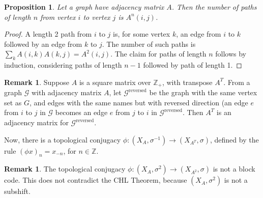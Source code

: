\documentclass{amsart}
\newtheorem{prop}[equation]{Proposition}
\theoremstyle{definition}
\newtheorem{rem}[equation]{Remark}
\theoremstyle{definition}
\newcommand{\Z}{\mathbb Z}
\numberwithin{equation}{subsection}
\begin{document}
\begin{prop}  \label{pathsandpowers}
Let a graph have adjacency matrix $A$.
Then the number of paths of length $n$ from vertex $i$ to
vertex $j$ is $A^n(i,j)$.
\end{prop}
\begin{proof}
A length 2 path from $i$ to $j$ is, for some vertex $k$,
 an edge from $i$ to $k$ followed by an edge from $k$ to $j$.
The number of such paths is $\sum_k A(i,k) A(k,j) = A^2 (i,j)$.
The claim for paths of length $n$ follows by induction,
considering paths of length $n-1$ followed by path of length 1.
\end{proof}


\begin{rem} \label{TransposeAndInverse}
Suppose $A$ is a square matrix over $\Z_+$, with transpose $A^T$.
From a graph $\mathcal G$ with adjacency matrix $A$,
let $\mathcal G^{\text{reversed}} $ be the graph with the same vertex set as $G$,
and edges with the same names but with reversed direction
(an edge $e$ from $i$ to $j$ in $\mathcal G$ becomes an edge
$e$ from $j$ to $i$ in  $\mathcal G^{\text{reversed}} $.
 Then
 $A^T$ is an adjacency matrix for $\mathcal G^{\text{reversed}} $.

Now, there is a topological conjugacy
 $\phi: (X_A, \sigma^{-1})\to (X_{A^T} , \sigma)$, defined by the
rule $(\phi x)_n = x_{-n}$, for $n\in \Z$.
\end{rem}

\begin{rem} \label{notblock}
The topological   conjugacy
$\phi : (X_A, \sigma^2 ) \to (X_{A^2}, \sigma )$
is not a block code.
 This does not contradict the
CHL Theorem, because $(X_A, \sigma^2)$ is not a subshift.
\end{rem}
\end{document}

